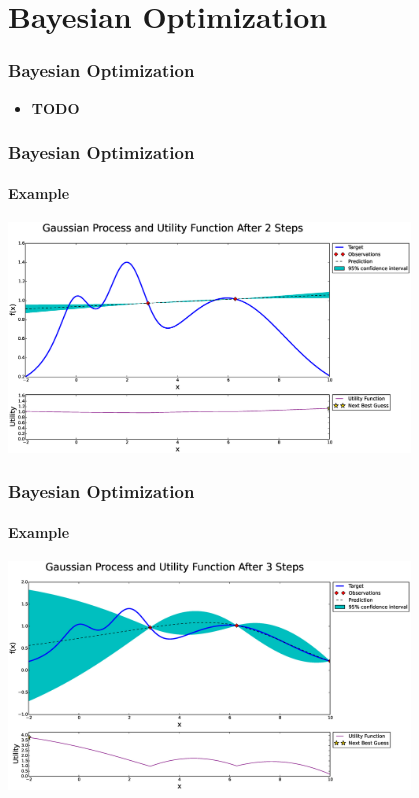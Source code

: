 \section{Bayesian Optimization}

\begin{frame}
\frametitle{Bayesian Optimization}

\begin{itemize}
	\item \textbf{TODO}
\end{itemize}
\end{frame}

\begin{frame}
\frametitle{Bayesian Optimization}
\framesubtitle{Example}

\centering
\includegraphics[width=0.8\textwidth]{figures/bayesian-optimization/fig0}

\end{frame}

\begin{frame}
	\frametitle{Bayesian Optimization}
	\framesubtitle{Example}
	
	\centering
	\includegraphics[width=0.8\textwidth]{figures/bayesian-optimization/fig1}
	
\end{frame}

